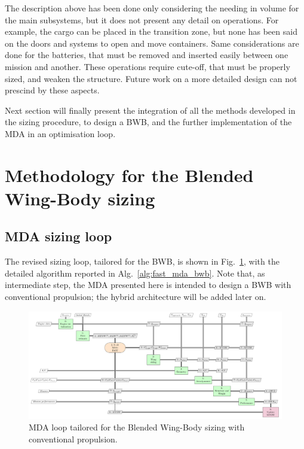 The description above has been done only considering the needing in volume for the main subsystems, but it does not present any detail on operations. 
For example, the cargo can be placed in the transition zone, but none has been said on the doors and systems to open and move containers. 
Same considerations are done for the batteries, that must be removed and inserted easily between one mission and another. 
These operations require cute-off, that must be properly sized, and weaken the structure. 
Future work on a more detailed design can not prescind by these aspects. 

Next section will finally present the integration of all the methods developed in the sizing procedure, to design a BWB, and the further implementation of the MDA in an optimisation loop. 

\section{Methodology for the Blended Wing-Body sizing}
\label{sec:chap4_bwb_sizing}

\subsection{MDA sizing loop}
\label{subsec:chap4_bwb_mda}

The revised sizing loop, tailored for the BWB, is shown in Fig.~\ref{fig:fast_mda_bwb}, with the detailed algorithm reported in Alg.~\ref{alg:fast_mda_bwb}.
Note that, as intermediate step, the MDA presented here is intended to design a BWB with conventional propulsion; the hybrid architecture will be added later on.
\begin{figure}[!h]
	\centering
	\includegraphics[keepaspectratio, width=1.3\textwidth, angle=90]{images/chap4/FAST_MDA_BWB}
	\caption{MDA loop tailored for the Blended Wing-Body sizing with conventional propulsion.}
	\label{fig:fast_mda_bwb}
\end{figure}

